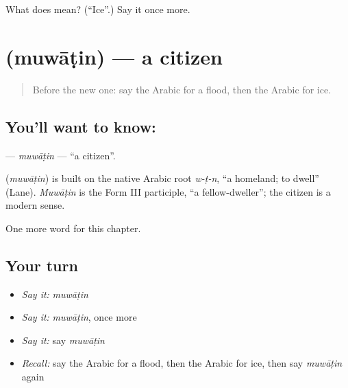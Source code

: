 \begin{tcolorbox}[breakable,colback=teal!4,colframe=teal!35!black,title={Before you move on}]
What does  mean? (\textquotedblleft{}Ice\textquotedblright{}.) Say it once more.
\end{tcolorbox}
\section[\texorpdfstring{\ar{مواطن} (muwāṭin)}{مواطن (muwāṭin)}]{ (muwāṭin) — a citizen}

\label{lesson:AR-C236-muwatin}



\begin{quote}
Before the new one: say the Arabic for a flood, then the Arabic for ice.
\end{quote}

\subsection*{You'll want to know: }
\textbf{} — \emph{muwāṭin} — \textquotedblleft{}a citizen\textquotedblright{}.

\begin{cousinweb}
\textbf{} (\emph{muwāṭin}) is built on the native Arabic root \emph{w-ṭ-n}, \textquotedblleft{}a homeland; to dwell\textquotedblright{} (Lane). \emph{Muwāṭin} is the Form III participle, \textquotedblleft{}a fellow-dweller\textquotedblright{}; the citizen is a modern sense.
\end{cousinweb}

\begin{grammarlens}[title={What you've built}]
One more word for this chapter.
\end{grammarlens}

\subsection*{Your turn}
\begin{itemize}
\raggedright
  \item \emph{Say it:} \emph{muwāṭin}
  \item \emph{Say it:} \emph{muwāṭin}, once more
  \item \emph{Say it:} say \emph{muwāṭin}
  \item \emph{Recall:} say the Arabic for a flood, then the Arabic for ice, then say \emph{muwāṭin} again
\end{itemize}

